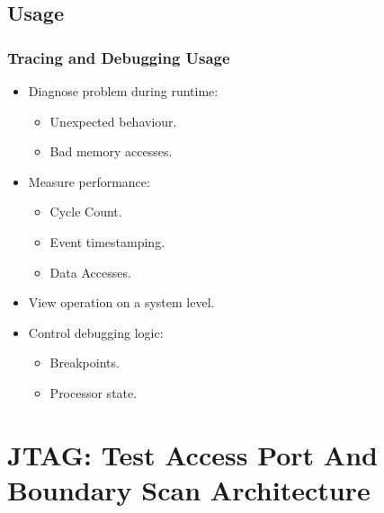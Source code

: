 \documentclass{beamer}
\begin{document}
\subsection{Usage}
\begin{frame}
    \frametitle{Tracing and Debugging Usage}
    \begin{itemize}
        \item Diagnose problem during runtime:
            \begin{itemize}
                \item Unexpected behaviour.
                \item Bad memory accesses.
            \end{itemize}
        \item Measure performance:
            \begin{itemize}
                \item Cycle Count.
                \item Event timestamping.
                \item Data Accesses.
            \end{itemize}
        \item View operation on a system level.
        \item Control debugging logic:
            \begin{itemize}
                \item Breakpoints.
                \item Processor state.
            \end{itemize}
    \end{itemize}
\end{frame}

\section{JTAG: Test Access Port And Boundary Scan Architecture}
\end{document}
